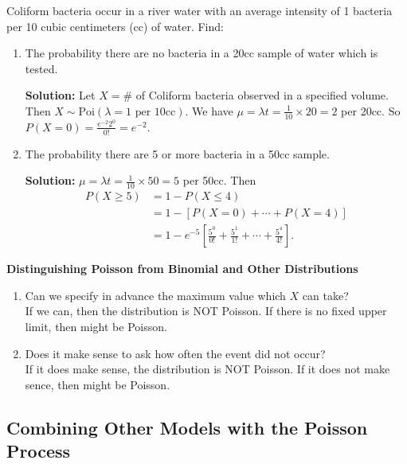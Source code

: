 \begin{example}
    Coliform bacteria occur in a river water with an average intensity of 1 bacteria per 10 cubic centimeters (cc) of water. Find:
    \begin{enumerate}[label=(\alph*)]
        \item The probability there are no bacteria in a 20cc sample of water which is tested.
        
        \textbf{Solution:} Let $X = \#$ of Coliform bacteria observed in a specified volume. Then $X \sim \text{Poi}(\lambda = 1 \text{ per 10cc})$.
        We have $\mu = \lambda t = \frac{1}{10} \times 20 = 2$ per 20cc. So $P(X = 0) = \frac{e^{-2} 2^0}{0!} = e^{-2}$.
        \item The probability there are 5 or more bacteria in a 50cc sample.
        
        \textbf{Solution:} $\mu = \lambda t = \frac{1}{10} \times 50 = 5$ per 50cc. Then \vspace{-5mm}
        \begin{align*}
            P(X \geq 5) &= 1 - P(X \leq 4) \\
            &= 1 - \left[ P(X=0) + \cdots + P(X=4) \right] \\
            &= 1 - e^{-5} \left[ \frac{5^0}{0!} + \frac{5^1}{1!} + \cdots + \frac{5^4}{4!} \right].
        \end{align*}
    \end{enumerate}
\end{example}


\textbf{Distinguishing Poisson from Binomial and Other Distributions}

\begin{enumerate}
    \item Can we specify in advance the maximum value which $X$ can take? \\
    If we can, then the distribution is NOT Poisson. If there is no fixed upper limit, then might be Poisson.
    \item Does it make sense to ask how often the event did not occur? \\
    If it does make sense, the distribution is NOT Poisson. If it does not make sence, then might be Poisson.
\end{enumerate}


\subsection{Combining Other Models with the Poisson Process}

